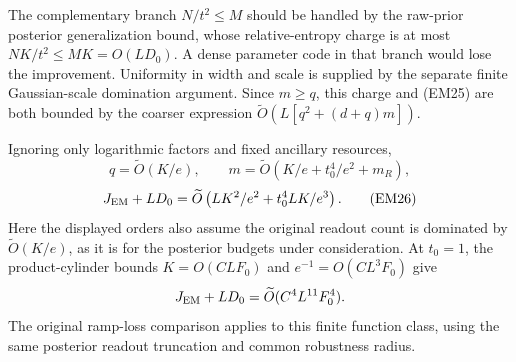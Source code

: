 The complementary branch $N/t^2\le M$ should be handled by the raw-prior
posterior generalization bound, whose relative-entropy charge is at most
$NK/t^2\le MK=O(LD_0)$. A dense parameter code in that branch would
lose the improvement. Uniformity in width and scale is supplied by the
separate finite Gaussian-scale domination argument. Since $m\ge q$,
this charge and (EM25) are both bounded by the coarser expression
$\widetilde O(L[q^2+(d+q)m])$.

Ignoring only logarithmic factors and fixed ancillary resources,
\[
 q=\widetilde O(K/e),\qquad
 m=\widetilde O\left(K/e+t_0^4/e^2+m_R\right),
\]
\[
 J_{\rm EM}+LD_0
 =\widetilde O\left(LK^2/e^2+t_0^4LK/e^3\right).
 \tag{EM26}
\]
Here the displayed orders also assume the original readout count is
dominated by $\widetilde O(K/e)$, as it is for the posterior budgets
under consideration. At $t_0=1$, the product-cylinder bounds
$K=O(CLF_0)$ and $e^{-1}=O(CL^3F_0)$ give
\[
 J_{\rm EM}+LD_0=\widetilde O(C^4L^{11}F_0^4).
\]
The original ramp-loss comparison applies to this finite function class,
using the same posterior readout truncation and common robustness radius.
